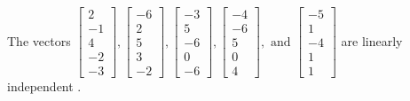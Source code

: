 \begin{exercise}
\begin{exerciseStatement}
  \end{exerciseStatement}
  \begin{exerciseAnswer}
   The vectors \(\left[\begin{array}{r}
2 \\
-1 \\
4 \\
-2 \\
-3
\end{array}\right] , \left[\begin{array}{r}
-6 \\
2 \\
5 \\
3 \\
-2
\end{array}\right] , \left[\begin{array}{r}
-3 \\
5 \\
-6 \\
0 \\
-6
\end{array}\right] , \left[\begin{array}{r}
-4 \\
-6 \\
5 \\
0 \\
4
\end{array}\right] , \text{ and } \left[\begin{array}{r}
-5 \\
1 \\
-4 \\
1 \\
1
\end{array}\right]\) are 
  	 linearly independent  .
  


  \end{exerciseAnswer}
\end{exercise}